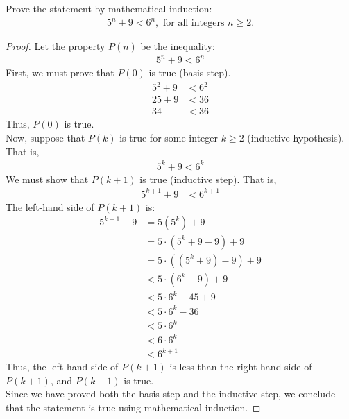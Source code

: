 \documentclass[name=Ojas\ Chaturvedi, emailid=oj.chaturvedi.2024, course=Capstone:\ Discrete\ Math, num=9, deadline={November\ 17,\ 2023}]{homework}
\begin{document}
    Prove the statement by mathematical induction:
    \begin{align*}
        5^n + 9 < 6^n, \text{ for all integers } n \geq 2.
    \end{align*}
\begin{proof}
    Let the property $P(n)$ be the inequality:
    \begin{align*}
        5^n + 9 < 6^n
    \end{align*}
    First, we must prove that $P(0)$ is true (basis step).
    \begin{align*}
        5^2 + 9 &< 6^2 \\
        25 + 9 &< 36 \\
        34 &< 36
    \end{align*}
    Thus, $P(0)$ is true. \\
    Now, suppose that $P(k)$ is true for some integer $k \geq 2$ (inductive hypothesis). That is,
    \begin{align*}
        5^k + 9 < 6^k
    \end{align*}
    We must show that $P(k+1)$ is true (inductive step). That is,
    \begin{align*}
        5^{k+1} + 9 &< 6^{k+1}
    \end{align*}
    The left-hand side of $P(k+1)$ is:
    \begin{align*}
        5^{k+1} + 9 &= 5(5^k) + 9 \\
        &= 5 \cdot (5^k + 9 - 9) + 9 \\
        &= 5 \cdot ((5^k + 9) - 9) + 9 \\
        &< 5 \cdot (6^k-9) + 9 \\
        &< 5 \cdot 6^k - 45 + 9 \\
        &< 5 \cdot 6^k - 36 \\
        &< 5 \cdot 6^k \\
        &< 6 \cdot 6^k \\
        &< 6^{k+1}
    \end{align*}
    Thus, the left-hand side of $P(k+1)$ is less than the right-hand side of $P(k+1)$, and $P(k+1)$ is true. \\
    Since we have proved both the basis step and the inductive step, we conclude that the statement is true using mathematical induction.
\end{proof}
\end{document}
